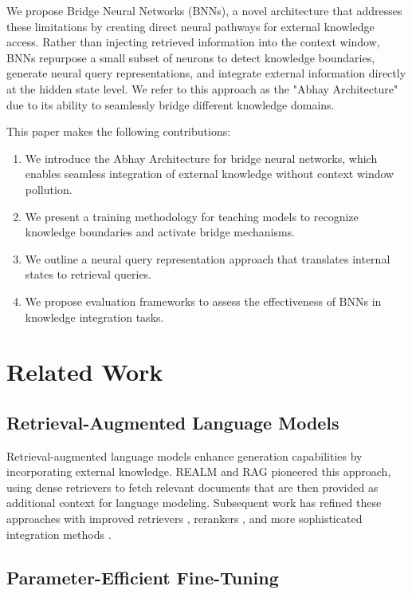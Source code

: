 \documentclass[9pt,a4paper,twocolumn,twoside]{tau-class/tau}
\begin{document}
    We propose Bridge Neural Networks (BNNs), a novel architecture that addresses these limitations by creating direct neural pathways for external knowledge access. Rather than injecting retrieved information into the context window, BNNs repurpose a small subset of neurons to detect knowledge boundaries, generate neural query representations, and integrate external information directly at the hidden state level. We refer to this approach as the "Abhay Architecture" due to its ability to seamlessly bridge different knowledge domains.

    This paper makes the following contributions:
    \begin{enumerate}
        \item We introduce the Abhay Architecture for bridge neural networks, which enables seamless integration of external knowledge without context window pollution.
        \item We present a training methodology for teaching models to recognize knowledge boundaries and activate bridge mechanisms.
        \item We outline a neural query representation approach that translates internal states to retrieval queries.
        \item We propose evaluation frameworks to assess the effectiveness of BNNs in knowledge integration tasks.
    \end{enumerate}

\section{Related Work}

\subsection{Retrieval-Augmented Language Models}

    Retrieval-augmented language models enhance generation capabilities by incorporating external knowledge. REALM \cite{guu2020realm} and RAG \cite{lewis2020retrieval} pioneered this approach, using dense retrievers to fetch relevant documents that are then provided as additional context for language modeling. Subsequent work has refined these approaches with improved retrievers \cite{karpukhin2020dense}, rerankers \cite{nogueira2019passage}, and more sophisticated integration methods \cite{izacard2021leveraging}.

\subsection{Parameter-Efficient Fine-Tuning}
\end{document}
